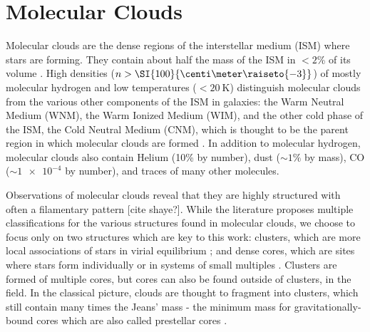 \label{chap:StarFormation}



\section{Molecular Clouds}

Molecular clouds are the dense regions of the interstellar medium (ISM) where stars are forming. They contain about half the mass of the ISM in $<2$\% of its volume \citep{Ferriere:2001gv}. High densities ($n > \SI{100}{\centi\meter\raiseto{-3}}$) of mostly molecular hydrogen and low temperatures ($< \SI{20}{\kelvin}$) distinguish molecular clouds from the various other components of the ISM in galaxies: the Warm Neutral Medium (WNM), the Warm Ionized Medium (WIM), and the other cold phase of the ISM, the Cold Neutral Medium (CNM), which is thought to be the parent region in which molecular clouds are formed \citep{Kennicutt:2012ey}. In addition to molecular hydrogen, molecular clouds also contain Helium (10\% by number), dust ($\sim 1\%$ by mass), CO ($\sim \num{1e-4}$ by number), and traces of many other molecules.

Observations of molecular clouds reveal that they are highly structured with often a filamentary pattern [cite shaye?]. While the literature proposes multiple classifications for the various structures found in molecular clouds, we choose to focus only on two structures which are key to this work: clusters, which are more local associations of stars in virial equilibrium \citep{Lada:2003il}; and dense cores, which are sites where stars form individually or in systems of small multiples \citep{Williams:2000wl}. Clusters are formed of multiple cores, but cores can also be found outside of clusters, in the field. In the classical picture, clouds are thought to fragment into clusters, which still contain many times the Jeans' mass - the minimum mass for gravitationally-bound cores \citep{Larson:1994cj} which are also called prestellar cores \citep{DiFrancesco:2007vg}.


